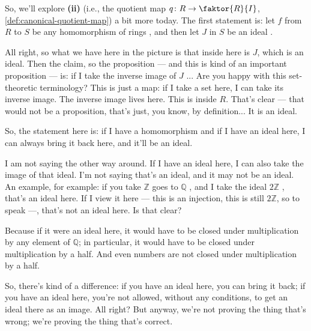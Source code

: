 \begin{speech}[00:08:05 - 00:10:25]
So, we'll explore \textbf{(ii)} (i.e., the quotient map $q \colon R \to \faktor{R}{I}$, \cref{def:canonical-quotient-map}) a bit more today. The first statement is: let $f$ from $R$ to $S$ be any homomorphism of rings , and then let $J$ in $S$ be an ideal .

All right, so what we have here in the picture is that inside here is $J$, which is an ideal. Then the claim, so the proposition --- and this is kind of an important proposition --- is: if I take the inverse image of $J$ ... Are you happy with this set-theoretic terminology? This is just a map: if I take a set here, I can take its inverse image. The inverse image lives here. This is inside $R$. That's clear --- that would not be a proposition, that's just, you know, by definition... It is an ideal.

So, the statement here is: if I have a homomorphism and if I have an ideal here, I can always bring it back here, and it'll be an ideal.

I am not saying the other way around. If I have an ideal here, I can also take the image of that ideal. I'm not saying that's an ideal, and it may not be an ideal. An example, for example: if you take $\mathbb{Z}$ goes to $\mathbb{Q}$ , and I take the ideal $2\mathbb{Z}$ , that's an ideal here. If I view it here --- this is an injection, this is still $2\mathbb{Z}$, so to speak  ---, that's not an ideal here. Is that clear?

Because if it were an ideal here, it would have to be closed under multiplication by any element of $\mathbb{Q}$; in particular, it would have to be closed under multiplication by a half. And even numbers are not closed under multiplication by a half.

So, there's kind of a difference: if you have an ideal here, you can bring it back; if you have an ideal here, you're not allowed, without any conditions, to get an ideal there as an image. All right? But anyway, we're not proving the thing that's wrong; we're proving the thing that's correct.
\end{speech}

